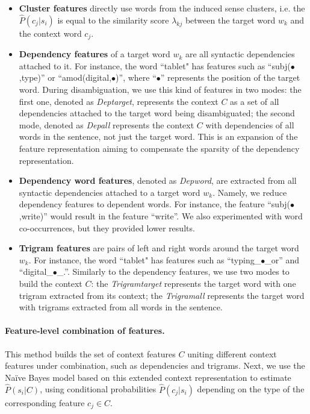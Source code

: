 \documentclass[11pt]{article}
\newcommand{\parm}{ \mathord{\bullet}}
\newenvironment{itemize2}
    {\begin{itemize}
        \vspace{-0.2em}
        \setlength{\abovedisplayskip}{0pt}
        \setlength{\belowdisplayskip}{0pt}
        \setlength{\itemsep}{5pt}
        \setlength{\parskip}{0pt}
        \setlength{\parsep}{0pt}
        \setlength{\topsep}{0pt}
        \setlength{\partopsep}{0pt}
    }
    {\vspace{-0.2em}
    \end{itemize}}
\begin{document}
\begin{itemize2}

\item \textbf{Cluster features} directly use words from the induced sense clusters, i.e. the $\hat{P}(c_j|s_i)$ is equal to the similarity score $\lambda_{kj}$ between the target word $w_k$ and the context word $c_j$. 

\item \textbf{Dependency features} of a target word $w_k$ are all syntactic dependencies attached to it. For instance, the word ``tablet" has features such as ``subj($\parm$,type)'' or ``amod(digital,$\parm$)'', where ``$\parm$'' represents the position of the target word. During disambiguation, we use this kind of features in two modes: the first one, denoted as \textit{Deptarget}, represents the context $C$ as a set of all dependencies attached to the target word being disambiguated; the second mode, denoted as \textit{Depall} represents the context $C$ with dependencies of all words in the sentence, not just the target word. This is an expansion of the feature representation aiming to compensate the sparsity of the dependency representation.


\item \textbf{Dependency word features}, denoted as \textit{Depword}, are extracted from all syntactic dependencies attached to a target word $w_k$. Namely, we reduce dependency features to dependent words. For instance, the feature ``subj($\parm$,write)'' would result in the feature ``write''. We also experimented with  word co-occurrences, but they  provided lower results.

\item \textbf{Trigram features} are pairs of left and right words around the target word $w_k$. For instance, the word ``tablet" has features such as ``typing\_$\parm$\_or'' and ``digital\_$\parm$\_.''. Similarly to the dependency features, we use two modes to build the context $C$: the \textit{Trigramtarget} represents the target word with one trigram extracted from its context; the \textit{Trigramall} represents the target word with trigrams extracted from all words in the sentence. 

\end{itemize2}

\paragraph{Feature-level combination of features. } This method builds the set of context features $C$ uniting different  context features under combination, such as dependencies and trigrams. Next, we use the Na\"ive Bayes model based on this extended context representation to estimate $\hat{P}(s_i|C)$, using conditional probabilities $\hat{P}(c_j|s_i)$ depending on the type of the corresponding feature $c_j \in C$. 
\end{document}
